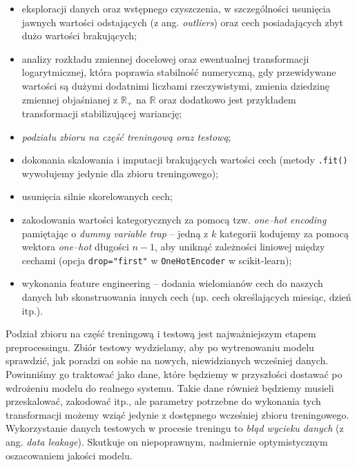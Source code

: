 \documentclass{myclass}
\numberwithin{equation}{subsection}
\begin{document}
\begin{itemize}
\item eksploracji danych oraz wstępnego czyszczenia, w szczególności usunięcia jawnych wartości
odstających (z ang. \textit{outliers}) oraz cech posiadających zbyt dużo wartości brakujących;

\item analizy rozkładu zmiennej docelowej oraz ewentualnej transformacji logarytmicznej, która
poprawia stabilność numeryczną, gdy przewidywane wartości są dużymi dodatnimi liczbami
rzeczywistymi, zmienia dziedzinę zmiennej objaśnianej z \(\mathbb{R}_+\) na \(\mathbb{R}\) oraz
dodatkowo jest przykładem transformacji stabilizującej wariancję;
    
\item \emph{podziału zbioru na część treningową oraz testową};

\item dokonania skalowania i imputacji brakujących wartości cech (metody \texttt{.fit()} wywołujemy
jedynie dla zbioru treningowego);

\item usunięcia silnie skorelowanych cech;

\item zakodowania wartości kategorycznych za pomocą tzw. \textit{one--hot encoding} pamiętając o
\textit{dummy variable trap} -- jedną z \(k\) kategorii kodujemy za pomocą wektora \textit{one--hot}
długości \(n-1\), aby uniknąć zależności liniowej między cechami (opcja \texttt{drop="first"} w
\texttt{OneHotEncoder} w scikit-learn);

\item wykonania feature engineering -- dodania wielomianów cech do naszych danych lub skonstruowania
innych cech (np. cech określających miesiąc, dzień itp.).
\end{itemize}

Podział zbioru na część treningową i testową jest najważniejszym etapem preprocessingu. Zbiór
testowy wydzielamy, aby po wytrenowaniu modelu sprawdzić, jak poradzi on sobie na nowych,
niewidzianych wcześniej danych. Powinniśmy go traktować jako dane, które będziemy w przyszłości
dostawać po wdrożeniu modelu do realnego systemu. Takie dane również będziemy musieli przeskalować,
zakodować itp., ale parametry potrzebne do wykonania tych transformacji możemy wziąć jedynie z
dostępnego wcześniej zbioru treningowego. Wykorzystanie danych testowych w procesie treningu to
\emph{błąd wycieku danych} (z ang. \textit{data leakage}). Skutkuje on niepoprawnym, nadmiernie
optymistycznym oszacowaniem jakości modelu.
\end{document}
